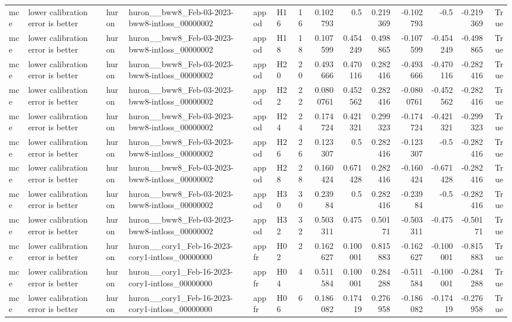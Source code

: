 \begin{longtable}{llllllrrrrrrrr}
mce & lower calibration error is better & huron & huron\_\_bww8\_Feb-03-2023-bww8-intloss\_00000002 & appod & H16 & 16 & 0.102793 & 0.5 & 0.219369 & -0.102793 & -0.5 & -0.219369 & True \\
mce & lower calibration error is better & huron & huron\_\_bww8\_Feb-03-2023-bww8-intloss\_00000002 & appod & H18 & 18 & 0.107599 & 0.454249 & 0.498865 & -0.107599 & -0.454249 & -0.498865 & True \\
mce & lower calibration error is better & huron & huron\_\_bww8\_Feb-03-2023-bww8-intloss\_00000002 & appod & H20 & 20 & 0.493666 & 0.470116 & 0.282416 & -0.493666 & -0.470116 & -0.282416 & True \\
mce & lower calibration error is better & huron & huron\_\_bww8\_Feb-03-2023-bww8-intloss\_00000002 & appod & H22 & 22 & 0.0800761 & 0.452562 & 0.282416 & -0.0800761 & -0.452562 & -0.282416 & True \\
mce & lower calibration error is better & huron & huron\_\_bww8\_Feb-03-2023-bww8-intloss\_00000002 & appod & H24 & 24 & 0.174724 & 0.421321 & 0.299323 & -0.174724 & -0.421321 & -0.299323 & True \\
mce & lower calibration error is better & huron & huron\_\_bww8\_Feb-03-2023-bww8-intloss\_00000002 & appod & H26 & 26 & 0.123307 & 0.5 & 0.282416 & -0.123307 & -0.5 & -0.282416 & True \\
mce & lower calibration error is better & huron & huron\_\_bww8\_Feb-03-2023-bww8-intloss\_00000002 & appod & H28 & 28 & 0.160424 & 0.671428 & 0.282416 & -0.160424 & -0.671428 & -0.282416 & True \\
mce & lower calibration error is better & huron & huron\_\_bww8\_Feb-03-2023-bww8-intloss\_00000002 & appod & H30 & 30 & 0.23984 & 0.5 & 0.282416 & -0.23984 & -0.5 & -0.282416 & True \\
mce & lower calibration error is better & huron & huron\_\_bww8\_Feb-03-2023-bww8-intloss\_00000002 & appod & H32 & 32 & 0.503311 & 0.475 & 0.50171 & -0.503311 & -0.475 & -0.50171 & True \\
mce & lower calibration error is better & huron & huron\_\_cory1\_Feb-16-2023-cory1-intloss\_00000000 & appfr & H02 & 2 & 0.162627 & 0.100001 & 0.815883 & -0.162627 & -0.100001 & -0.815883 & True \\
mce & lower calibration error is better & huron & huron\_\_cory1\_Feb-16-2023-cory1-intloss\_00000000 & appfr & H04 & 4 & 0.511584 & 0.100001 & 0.284288 & -0.511584 & -0.100001 & -0.284288 & True \\
mce & lower calibration error is better & huron & huron\_\_cory1\_Feb-16-2023-cory1-intloss\_00000000 & appfr & H06 & 6 & 0.186082 & 0.17419 & 0.276958 & -0.186082 & -0.17419 & -0.276958 & True \\

\end{longtable}

